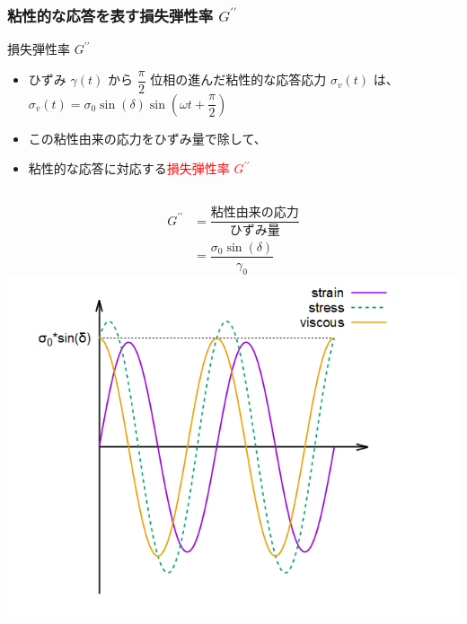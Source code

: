 \documentclass[unicode,12pt]{beamer}%
\begin{document}
\begin{frame}
    \frametitle{粘性的な応答を表す損失弾性率 $G^{\prime\prime}$}
		
		\begin{block}{損失弾性率 $G^{\prime\prime}$}
			\begin{itemize}
				\item ひずみ $\gamma(t)$ から $\dfrac{\pi}{2}$ 位相の進んだ粘性的な応答応力 $\sigma_v(t)$ は、
				$\sigma_v(t) = \sigma_0 \sin(\delta)\sin(\omega t + \dfrac{\pi}{2})$
				\item この粘性由来の応力をひずみ量で除して、
				\item 粘性的な応答に対応する\textcolor{red}{損失弾性率 $G^{\prime\prime}$}
			\end{itemize}
			\begin{columns}[c, onlytextwidth]
						\begin{align*}
							G^{\prime \prime} &= \dfrac{\text{粘性由来の応力}}{\text{ひずみ量}} \\
							&= \dfrac{\sigma_0 \sin(\delta)}{\gamma_0}
						\end{align*}
					\centering
					\includegraphics[width=.9\textwidth]{dynamic_rheo/dyn_rheo_visco.png}
			\end{columns}
		\end{block}
\end{frame}
\end{document}
